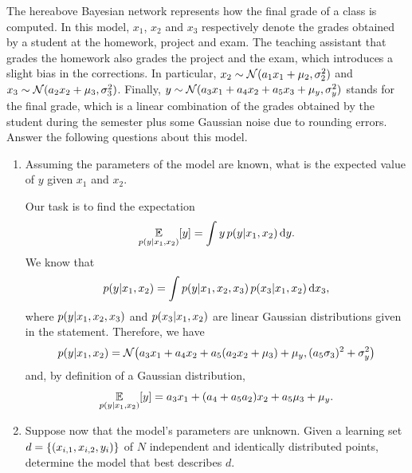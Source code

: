 \documentclass[11pt, a4paper]{article}
\begin{document}
The hereabove Bayesian network represents how the final grade of a class is computed. In this model, $x_1$, $x_2$ and $x_3$ respectively denote the grades obtained by a student at the homework, project and exam. The teaching assistant that grades the homework also grades the project and the exam, which introduces a slight bias in the corrections. In particular, $x_2 \sim \mathcal{N}(a_1 x_1 + \mu_2, \sigma_2^2)$ and $x_3 \sim \mathcal{N}(a_2 x_2 + \mu_3, \sigma_3^2)$. Finally, $y \sim \mathcal{N}(a_3 x_1 + a_4 x_2 + a_5 x_3 + \mu_y, \sigma_y^2)$ stands for the final grade, which is a linear combination of the grades obtained by the student during the semester plus some Gaussian noise due to rounding errors. Answer the following questions about this model.

\begin{enumerate}
    \item Assuming the parameters of the model are known, what is the expected value of $y$ given $x_1$ and $x_2$.

    \begin{solution}
        Our task is to find the expectation
        \begin{equation*}
            \underset{p(y \vert x_1, x_2)}{\mathbb{E}} [y] = \int y \, p(y \vert x_1, x_2) \operatorname{d}\!{y} .
        \end{equation*}
        We know that
        \begin{equation*}
            p(y \vert x_1, x_2) = \int p(y \vert x_1, x_2, x_3) \, p(x_3 \vert x_1, x_2) \operatorname{d}\!{x_3} ,
        \end{equation*}
        where $p(y \vert x_1, x_2, x_3)$ and $p(x_3 \vert x_1, x_2)$ are linear Gaussian distributions given in the statement. Therefore, we have
        \begin{equation*}
            p(y \knowing x_1, x_2) = \N\rbk*{a_3 x_1 + a_4 x_2 + a_5 (a_2 x_2 + \mu_3) + \mu_y, (a_5 \sigma_3)^2 + \sigma_y^2}
        \end{equation*}
        and, by definition of a Gaussian distribution,
        \begin{equation*}
            \underset{p(y \vert x_1, x_2)}{\mathbb{E}} [y] = a_3 x_1 + (a_4 + a_5 a_2) x_2 + a_5 \mu_3 + \mu_y.
        \end{equation*}
    \end{solution}

    \item \label{itm:mle} Suppose now that the model's parameters are unknown. Given a learning set $d = \{(x_{i,1}, x_{i,2}, y_i)\}$ of $N$ independent and identically distributed points, determine the model that best describes $d$.


\end{enumerate}
\end{document}
